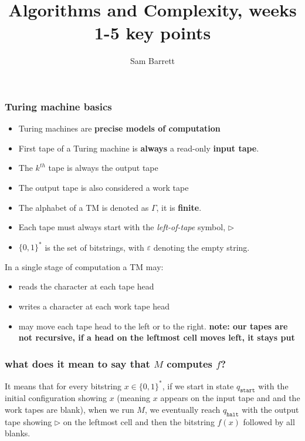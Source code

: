\documentclass{beamer}
\title{Algorithms and Complexity, weeks 1-5 key points}
\author{Sam Barrett}
\newcommand{\qs}{q_{\texttt{start}}}
\newcommand{\qh}{q_{\texttt{halt}}}
\begin{document}
\maketitle

\begin{frame}[allowframebreaks]
  \frametitle{Turing machine basics}

  \begin{itemize}
    \item Turing machines are \textbf{precise models of computation}
    \item First tape of a Turing machine is \textbf{always} a read-only \textbf{input tape}.
    \item The $k^{th}$ tape is always the output tape
    \item The output tape is also considered a work tape
    \item The alphabet of a TM is denoted as \(\Gamma\), it is \textbf{finite}.
    \item Each tape must always start with the \textit{left-of-tape} symbol, $\rhd$
    \item $\{ 0,1 \} ^{*}$ is the set of bitstrings, with $\varepsilon$ denoting the empty string.
  \end{itemize}

  \framebreak

  In a single stage of computation a TM may:
  \begin{itemize}
    \item reads the character at each tape head
    \item writes a character at each work tape head
    \item may move each tape head to the left or to the right. \textbf{note: our tapes are not recursive, if a head on the leftmost cell moves left, it stays put}
  \end{itemize}

\end{frame}

\begin{frame}
\frametitle{what does it mean to say that $M$ \textbf{computes} $f$?}

It means that for every bitstring $x \in \{ 0,1 \}^{*}$, if we start in state $\qs$ with the initial configuration showing $x$ (meaning $x$ appears on the input tape and and the work tapes are blank), when we run $M$, we eventually reach $\qh$ with the output tape showing $\rhd$ on the leftmost cell and then the bitstring $f(x)$ followed by all blanks.

\end{frame}
\end{document}

